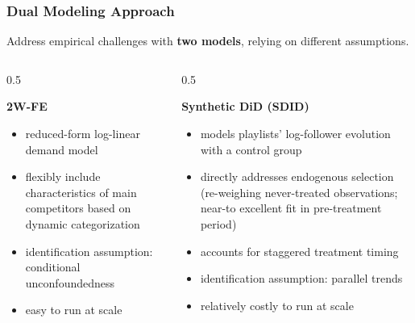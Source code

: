 \documentclass[8pt]{beamer}
\begin{document}
\begin{frame}%

\frametitle{Dual Modeling Approach}


Address empirical challenges with \textbf{two models}, relying on different assumptions.


\begin{columns}[T]
\begin{column}{0.5\textwidth}  
\begin{center}
\textbf{2W-FE}
\end{center}
\begin{itemize}
    \item reduced-form log-linear demand model \citep{shapiro_hitsch_tuchman_2021}
    \item flexibly include characteristics of main competitors based on dynamic categorization
    \item identification assumption: conditional unconfoundedness
    \item easy to run at scale
\end{itemize}
\end{column}

\begin{column}{0.5\textwidth}  
\begin{center}
\textbf{Synthetic DiD (SDID)}
\end{center}
\begin{itemize}
    \item models playlists' log-follower evolution with a control group \citep{SDiD_AER_Arkhangelsky_21}
    \item directly addresses endogenous selection (re-weighing never-treated observations; near-to excellent fit in pre-treatment period)
    \item accounts for staggered treatment timing
    \item identification assumption: parallel trends
    \item relatively costly to run at scale


\end{itemize}
\end{column}
\end{columns}
\end{frame}
\end{document}
